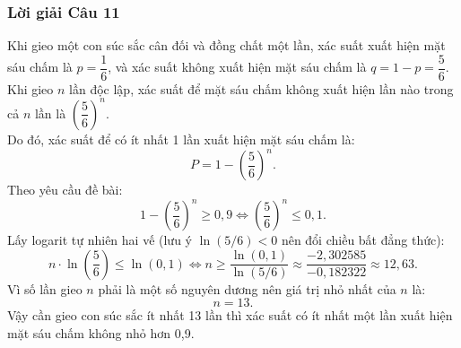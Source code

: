 \documentclass[12pt,a4paper]{article}
\theoremstyle{definition}
\begin{document}
\subsubsection*{Lời giải Câu 11}
Khi gieo một con súc sắc cân đối và đồng chất một lần, xác suất xuất hiện mặt sáu chấm là $p = \dfrac{1}{6}$, và xác suất không xuất hiện mặt sáu chấm là $q = 1 - p = \dfrac{5}{6}$.\\
Khi gieo $n$ lần độc lập, xác suất để mặt sáu chấm không xuất hiện lần nào trong cả $n$ lần là $\left(\dfrac{5}{6}\right)^n$.\\
Do đó, xác suất để có ít nhất 1 lần xuất hiện mặt sáu chấm là:
\[
P = 1 - \left(\frac{5}{6}\right)^n.
\]
Theo yêu cầu đề bài:
\[
1 - \left(\frac{5}{6}\right)^n \ge 0{,}9 \iff \left(\frac{5}{6}\right)^n \le 0{,}1.
\]
Lấy logarit tự nhiên hai vế (lưu ý $\ln(5/6) < 0$ nên đổi chiều bất đẳng thức):
\[
n \cdot \ln\left(\frac{5}{6}\right) \le \ln(0{,}1) \iff n \ge \frac{\ln(0{,}1)}{\ln(5/6)} \approx \frac{-2{,}302585}{-0{,}182322} \approx 12{,}63.
\]
Vì số lần gieo $n$ phải là một số nguyên dương nên giá trị nhỏ nhất của $n$ là:
\[
n = 13.
\]
Vậy cần gieo con súc sắc ít nhất 13 lần thì xác suất có ít nhất một lần xuất hiện mặt sáu chấm không nhỏ hơn 0,9.
\end{document}
